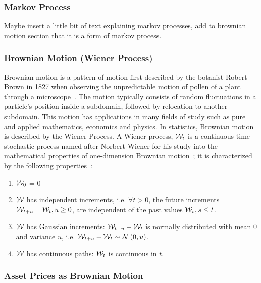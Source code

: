 \subsubsection{Markov Process}

Maybe insert a little bit of text explaining markov processes, add to brownian motion section that it is a form of markov process.

\subsubsection{Brownian Motion (Wiener Process)}

Brownian motion is a pattern of motion first described by the botanist Robert Brown in 1827 when observing the unpredictable motion of pollen of a plant through a microscope~\cite{pearle2010brown}. The motion typically consists of random fluctuations in a particle's position inside a subdomain, followed by relocation to another subdomain. This motion has applications in many fields of study such as pure and applied mathematics, economics and physics. In statistics, Brownian motion is described by the Wiener Process.
\nline{}
A Wiener process, \( \mathcal{W}_t \) is a continuous-time stochastic process named after Norbert Wiener for his study into the mathematical properties of one-dimension Brownian motion~\cite{wiener1976norbert}; it is characterized by the following properties~\cite{durrett2019probability}:

\begin{enumerate}
    \item \( \mathcal{W}_0 \) = 0
    \item \( \mathcal{W} \) has independent increments, i.e. \( \forall t>0 \), the future increments \( \mathcal{W}_{t+u} - \mathcal{W}_t, u \geq 0 \), are independent of the past values \( \mathcal{W}_s, s \leq t \).
    \item\label{Weiner process Gaussian increments} \( \mathcal{W} \) has Gaussian increments: \( \mathcal{W}_{t+u} - \mathcal{W}_t \) is normally distributed with mean 0 and variance \( u \), i.e. \hfill\break{} \( \mathcal{W}_{t+u} - \mathcal{W}_t \sim \mathcal{N}\left(0, u\right)\).
    \item \( \mathcal{W} \) has continuous paths: \( \mathcal{W}_t \) is continuous in \( t \).
\end{enumerate}

\subsubsection{Asset Prices as Brownian Motion}

